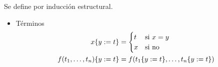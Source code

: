 \begin{definition}
    \label{nd:def:subst}
    Se define por inducción estructural.
    \begin{itemize}
        \item Términos
        \begin{align*}
            x\{y := t\} &= \begin{cases}
                t &\text{si } x = y\\
                x &\text{si no}
            \end{cases}\\
            f(t_1, \dots, t_n)\{y := t\} &=
                f(
                    t_1\{y := t\},
                    \dots,
                    t_n\{y := t\}
                )
        \end{align*}


\end{itemize}
\end{definition}
